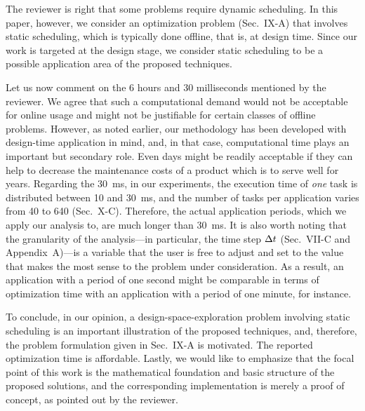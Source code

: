 \begin{authors}
The reviewer is right that some problems require dynamic scheduling. In this
paper, however, we consider an optimization problem (Sec.~IX-A) that involves
static scheduling, which is typically done offline, that is, at design time.
Since our work is targeted at the design stage, we consider static scheduling
to be a possible application area of the proposed techniques.

Let us now comment on the 6 hours and 30 milliseconds mentioned by the reviewer.
We agree that such a computational demand would not be acceptable for online
usage and might not be justifiable for certain classes of offline problems.
However, as noted earlier, our methodology has been developed with design-time
application in mind, and, in that case, computational time plays an important
but secondary role. Even days might be readily acceptable if they can help to
decrease the maintenance costs of a product which is to serve well for years.
Regarding the 30~ms, in our experiments, the execution time of \emph{one} task
is distributed between 10 and 30~ms, and the number of tasks per application
varies from 40 to 640 (Sec.~X-C). Therefore, the actual application periods,
which we apply our analysis to, are much longer than 30~ms. It is also worth
noting that the granularity of the analysis---in particular, the time step $\Delta t$
(Sec.~VII-C and Appendix~A)---is a variable that the user is free to adjust and
set to the value that makes the most sense to the problem under consideration.
As a result, an application with a period of one second might be comparable in
terms of optimization time with an application with a period of one minute, for
instance.

To conclude, in our opinion, a design-space-exploration problem involving static
scheduling is an important illustration of the proposed techniques, and,
therefore, the problem formulation given in Sec.~IX-A is motivated. The reported
optimization time is affordable. Lastly, we would like to emphasize that the
focal point of this work is the mathematical foundation and basic structure of
the proposed solutions, and the corresponding implementation is merely a proof
of concept, as pointed out by the reviewer.

\begin{actions}
\end{actions}
\end{authors}

